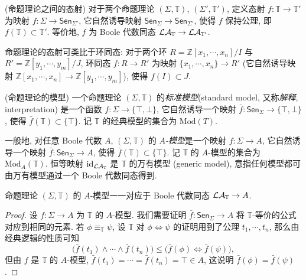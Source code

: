 \begin{definition}
	{(命题理论之间的态射)}
	对于两个命题理论 $(\Sigma,\mathbb T)$, $(\Sigma',\mathbb T')$, 定义态射 $f\colon \mathbb T \to \mathbb T'$ 为映射 $f\colon \Sigma \to \mathsf {Sen}_{\Sigma'}$, 它自然诱导映射 $\mathsf {Sen}_\Sigma\to \mathsf {Sen}_{\Sigma'}$, 使得 $f$ 保持公理, 即 $f(\mathbb T)\subset \mathbb T'$. 等价地, $f$ 为 Boole 代数同态 $\mathcal {LA}_{\mathbb T} \to \mathcal {LA}_{\mathbb T'}$.
\end{definition}

\begin{remark}
	{}
	命题理论的态射可类比于环同态: 对于两个环 $R=\mathbb{Z}[x_1,\cdots,x_n]/I$ 与 $R'=\mathbb{Z}[y_1,\cdots,y_m]/J$, 环同态 $f\colon R\to R'$ 为映射 $\{x_1,\cdots,x_n\}\to R'$ (它自然诱导映射 $\mathbb{Z}[x_1,\cdots,x_n]\to \mathbb{Z}[y_1,\cdots,y_m]$), 使得 $f(I)\subset J$.
\end{remark}

\begin{definition}
	{(命题理论的模型)}
	一个命题理论 $(\Sigma,\mathbb T)$ 的\emph{标准模型}\footnotemark (standard model, 又称\emph{解释}, interpretation) 是一个函数 $f\colon \Sigma \to \{\top,\bot\}$, 它自然诱导一个映射 $\bar f\colon \mathsf {Sen}_\Sigma\to\{\top,\bot\}$, 使得 $\bar f(\mathbb T)\subset \{\top\}$. 记 $\mathbb T$ 的经典模型的集合为 $\text{Mod}(T)$.
	
	一般地, 对任意 Boole 代数 $A$, $(\Sigma,\mathbb T)$ 的 \emph{$A$-模型}是一个映射 $f\colon \Sigma \to A$, 它自然诱导一个映射 $\bar f\colon \mathsf {Sen}_\Sigma\to A$, 使得 $\bar f(\mathbb T)\subset \{\top\}$. 记 $\mathbb T$ 的 $A$-模型的集合为 $\text{Mod}_A(\mathbb T)$. 恒等映射 $\operatorname{id}_{\mathcal {LA}_{\mathbb T}}$ 是 $\mathbb T$ 的万有模型 (generic model), 意指任何模型都可由万有模型通过一个 Boole 代数同态得到.
\end{definition}


\begin{prop}
	[label={model-boolealg-homomorphism}]
	{}
	命题理论 $(\Sigma,\mathbb T)$ 的 $A$-模型一一对应于 Boole 代数同态 $\mathcal {LA}_{\mathbb T} \to A$.
\end{prop}

\begin{proof}
	设 $f\colon \Sigma\to A$ 为 $\mathbb T$ 的 $A$-模型. 我们需要证明 $\bar f\colon \mathsf {Sen}_\Sigma\to A$ 将 $\mathbb T$-等价的公式对应到相同的元素. 若 $\phi \equiv_{\mathbb T} \psi$, 设 $\mathbb T$ 对 $\phi \Leftrightarrow\psi$ 的证明用到了公理 $t_1,\cdots,t_n$, 那么由经典逻辑的性质可知
	$$
	\big( \bar f(t_1) \land \cdots \land \bar f (t_n) \big) \leq \big( \bar f(\phi) \Leftrightarrow \bar f(\psi) \big),
	$$
	但由 $f$ 是 $\mathbb T$ 的 $A$-模型, $\bar f(t_1)=\cdots = \bar f(t_n) = \top\in A$, 这说明 $\bar f(\phi) = \bar f(\psi)$.
\end{proof}

